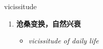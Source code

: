
\begin{frame}
{\huge vicissitude}
\begin{center}
\begin{enumerate}\Large
  \item \textbf{沧桑变换，自然兴衰}
  \begin{itemize}
    \item \em{\Large{vicissitude of daily life}}
  \end{itemize}
\end{enumerate}
\end{center}
\end{frame}
